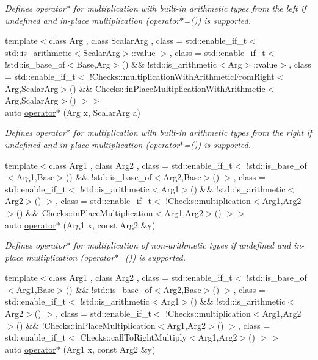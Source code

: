 \begin{DoxyCompactItemize}
\begin{DoxyCompactList}\small\item\em Defines operator$\ast$ for multiplication with built-\/in arithmetic types from the left if undefined and in-\/place multiplication (operator$\ast$=()) is supported. \end{DoxyCompactList}\item 
{\footnotesize template$<$class Arg , class Scalar\+Arg , class  = std\+::enable\+\_\+if\+\_\+t$<$ std\+::is\+\_\+arithmetic$<$\+Scalar\+Arg$>$\+::value $>$, class  = std\+::enable\+\_\+if\+\_\+t$<$ !std\+::is\+\_\+base\+\_\+of$<$\+Base,\+Arg$>$() \&\& !std\+::is\+\_\+arithmetic$<$\+Arg$>$\+::value$>$, class  = std\+::enable\+\_\+if\+\_\+t$<$ !\+Checks\+::multiplication\+With\+Arithmetic\+From\+Right$<$\+Arg,\+Scalar\+Arg$>$() \&\&                                       Checks\+::in\+Place\+Multiplication\+With\+Arithmetic$<$\+Arg,\+Scalar\+Arg$>$() $>$$>$ }\\auto \hyperlink{namespaceFunG_a3cd5a2cb1abba842154691bb84aab896}{operator$\ast$} (Arg x, Scalar\+Arg a)
\begin{DoxyCompactList}\small\item\em Defines operator$\ast$ for multiplication with built-\/in arithmetic types from the right if undefined and in-\/place multiplication (operator$\ast$=()) is supported. \end{DoxyCompactList}\item 
{\footnotesize template$<$class Arg1 , class Arg2 , class  = std\+::enable\+\_\+if\+\_\+t$<$ !std\+::is\+\_\+base\+\_\+of$<$\+Arg1,\+Base$>$() \&\& !std\+::is\+\_\+base\+\_\+of$<$\+Arg2,\+Base$>$() $>$, class  = std\+::enable\+\_\+if\+\_\+t$<$ !std\+::is\+\_\+arithmetic$<$\+Arg1$>$() \&\& !std\+::is\+\_\+arithmetic$<$\+Arg2$>$() $>$, class  = std\+::enable\+\_\+if\+\_\+t$<$ !\+Checks\+::multiplication$<$\+Arg1,\+Arg2$>$() \&\&                                       Checks\+::in\+Place\+Multiplication$<$\+Arg1,\+Arg2$>$() $>$$>$ }\\auto \hyperlink{namespaceFunG_ad023f2d2273af693f2b4ebceeb296dc8}{operator$\ast$} (Arg1 x, const Arg2 \&y)
\begin{DoxyCompactList}\small\item\em Defines operator$\ast$ for multiplication of non-\/arithmetic types if undefined and in-\/place multiplication (operator$\ast$=()) is supported. \end{DoxyCompactList}\item 
{\footnotesize template$<$class Arg1 , class Arg2 , class  = std\+::enable\+\_\+if\+\_\+t$<$ !std\+::is\+\_\+base\+\_\+of$<$\+Arg1,\+Base$>$() \&\& !std\+::is\+\_\+base\+\_\+of$<$\+Arg2,\+Base$>$() $>$, class  = std\+::enable\+\_\+if\+\_\+t$<$ !std\+::is\+\_\+arithmetic$<$\+Arg1$>$() \&\& !std\+::is\+\_\+arithmetic$<$\+Arg2$>$() $>$, class  = std\+::enable\+\_\+if\+\_\+t$<$ !\+Checks\+::multiplication$<$\+Arg1,\+Arg2$>$() \&\&                                       !\+Checks\+::in\+Place\+Multiplication$<$\+Arg1,\+Arg2$>$() $>$, class  = std\+::enable\+\_\+if\+\_\+t$<$ Checks\+::call\+To\+Right\+Multiply$<$\+Arg1,\+Arg2$>$() $>$$>$ }\\auto \hyperlink{namespaceFunG_a6e4d3266e119cd102800bf5c091e57fd}{operator$\ast$} (Arg1 x, const Arg2 \&y)

\end{DoxyCompactItemize}
